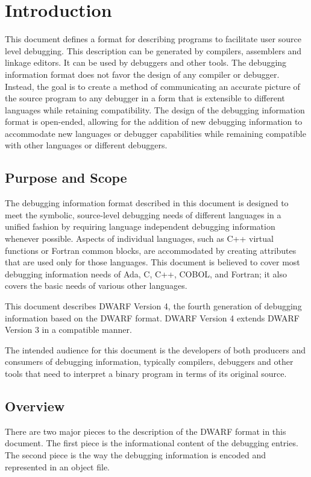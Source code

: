 \chapter{Introduction}
\label{chap:introduction}
This document defines a format for describing programs to
facilitate user source level debugging. This description
can be generated by compilers, assemblers and linkage
editors. 
It can be used by debuggers and other tools. 
The
debugging information format does not favor the design of any
compiler or debugger. 
Instead, the goal is to create a method
of communicating an accurate picture of the source program
to any debugger in a form that is extensible to different
languages while retaining compatibility.  
The design of the
debugging information format is open-ended, allowing for
the addition of new debugging information to accommodate new
languages or debugger capabilities while remaining compatible
with other languages or different debuggers.

\section{Purpose and Scope}
The debugging information format described in this document is
designed to meet the symbolic, source-level debugging needs of
different languages in a unified fashion by requiring language
independent debugging information whenever possible.  
Aspects
of individual languages, such as C++ virtual functions or
Fortran common blocks, are accommodated by creating attributes
that are used only for those languages. 
This document is
believed to cover most debugging information needs of Ada,
C, C++, COBOL, and Fortran; it also covers the basic needs
of various other languages.

This document describes DWARF Version 4, the fourth generation
of debugging information based on the DWARF format. DWARF
Version 4 extends DWARF Version 3 in a compatible manner.

The intended audience for this document is the developers
of both producers and consumers of debugging information,
typically compilers, debuggers and other tools that need to
interpret a binary program in terms of its original source.

\section{Overview}


There are two major pieces to the description of the DWARF
format in this document. The first piece is the informational
content of the debugging entries. The second piece is the
way the debugging information is encoded and represented in
an object file.

